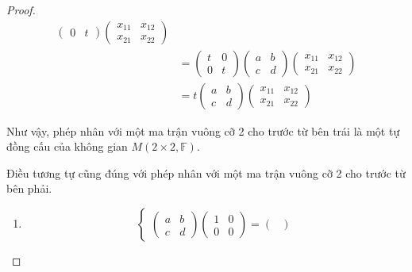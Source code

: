 \documentclass[class=linearalgebra,crop=false]{standalone}
\begin{document}
\begin{proof}
\begin{align*}
\begin{pmatrix}
            0 & t
        \end{pmatrix}
        \begin{pmatrix}
            x_{11} & x_{12} \\
            x_{21} & x_{22}
        \end{pmatrix} \\
        & =
        \begin{pmatrix}
            t & 0 \\
            0 & t
        \end{pmatrix}
        \begin{pmatrix}
            a & b \\
            c & d
        \end{pmatrix}
        \begin{pmatrix}
            x_{11} & x_{12} \\
            x_{21} & x_{22}
        \end{pmatrix} \\
        & =
        t
        \begin{pmatrix}
            a & b \\
            c & d
        \end{pmatrix}
        \begin{pmatrix}
            x_{11} & x_{12} \\
            x_{21} & x_{22}
        \end{pmatrix}
    \end{align*}
    \par Như vậy, phép nhân với một ma trận vuông cỡ 2 cho trước từ bên trái là một tự đồng cấu của không gian $M(2\times 2,\mathbb{F})$.
    \par Điều tương tự cũng đúng với phép nhân với một ma trận vuông cỡ 2 cho trước từ bên phải.
    \begin{enumerate}[label = (\alph*)]
        \item
            \[
                \begin{cases}
                    \begin{pmatrix}
                        a & b \\
                        c & d
                    \end{pmatrix}
                    \begin{pmatrix}
                        1 & 0 \\
                        0 & 0
                    \end{pmatrix}=
                    \begin{pmatrix}

\end{pmatrix}
\end{cases}\]
\end{enumerate}
\end{proof}
\end{document}

